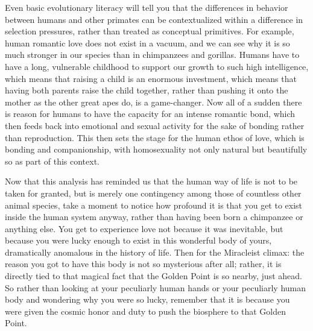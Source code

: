 Even basic evolutionary literacy will tell you that the differences in
behavior between humans and other primates can be contextualized within a
difference in selection pressures, rather than treated as conceptual
primitives. For example, human romantic love does not exist in a vacuum, and
we can see why it is so much stronger in our species than in chimpanzees and
gorillas. Humans have to have a long, vulnerable childhood to support our
growth to such high intelligence, which means that raising a child is an
enormous investment, which means that having both parents raise the child
together, rather than pushing it onto the mother as the other great apes do,
is a game-changer. Now all of a sudden there is reason for humans to have the
capacity for an intense romantic bond, which then feeds back into emotional
and sexual activity for the sake of bonding rather than reproduction. This
then sets the stage for the human ethos of love, which is bonding and
companionship, with homosexuality not only natural but beautifully so as part
of this context.

Now that this analysis has reminded us that the human way of life is not to be
taken for granted, but is merely one contingency among those of countless
other animal species, take a moment to notice how profound it is that you get
to exist inside the human system anyway, rather than having been born a
chimpanzee or anything else. You get to experience love not because it was
inevitable, but because you were lucky enough to exist in this wonderful body
of yours, dramatically anomalous in the history of life. Then for the
Miracleist climax: the reason you got to have this body is not so mysterious
after all; rather, it is directly tied to that magical fact that the Golden
Point is so nearby, just ahead. So rather than looking at your peculiarly
human hands or your peculiarly human body and wondering why you were so lucky,
remember that it is because you were given the cosmic honor and duty to push
the biosphere to that Golden Point.

